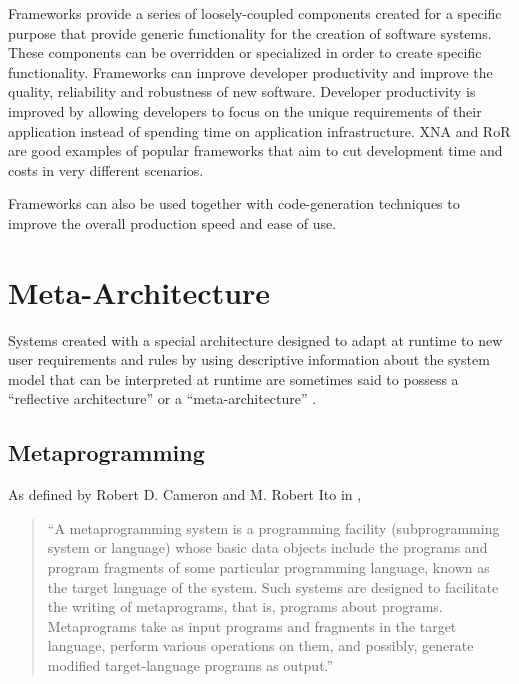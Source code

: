 Frameworks provide a series of loosely-coupled components created for a specific purpose that provide generic functionality for the creation of software systems. These components can be overridden or specialized in order to create specific functionality. Frameworks can improve developer productivity and improve the quality, reliability and robustness of new software.  Developer productivity is improved by allowing developers to focus on the unique requirements of their application instead of spending time on application infrastructure. XNA \cite{xna} and RoR \cite{rubyonrails} are good examples of popular frameworks that aim to cut development time and costs in very different scenarios.

Frameworks can also be used together with code-generation techniques \cite{DH04, rails_generators} to improve the overall production speed and ease of use.


\section{Meta-Architecture}\label{sec:meta-architecture}

Systems created with a special architecture designed to adapt at runtime to new user requirements and rules by using descriptive information about the system model that can be interpreted at runtime are sometimes said to possess a ``reflective architecture'' or a ``meta-architecture'' \cite{YBJ01}.

\subsection{Metaprogramming}\label{sec:metaprogramming}

As defined by Robert D. Cameron and M. Robert Ito in \cite{CI84},

\begin{quote}
 ``A metaprogramming system is a programming facility (subprogramming system or language) whose basic data objects include the programs and program fragments of some particular programming language, known as the target language of the system. Such systems are designed to facilitate the writing of metaprograms, that is, programs about programs. Metaprograms take as input programs and fragments in the target language, perform various operations on them, and possibly, generate modified target-language programs as output.''
\end{quote}

